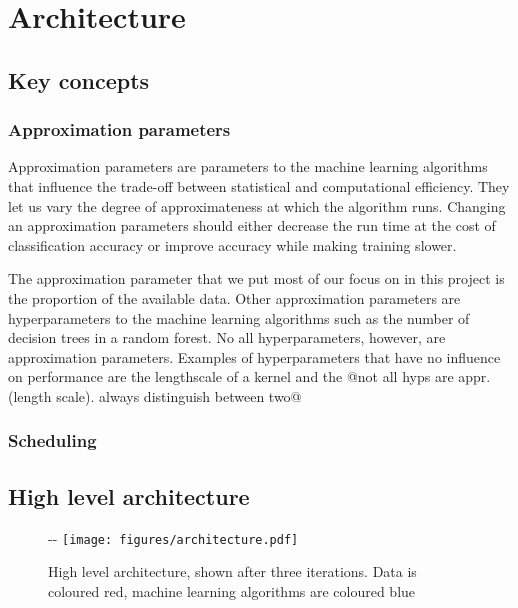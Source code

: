 \documentclass[a4paper,12pt,twoside,openright]{report}
\begin{document}
\section{Architecture} %
\subsection{Key concepts}
\subsubsection{Approximation parameters}
Approximation parameters are parameters to the machine learning algorithms that influence the trade-off between statistical and computational efficiency. They let us vary the degree of approximateness at which the algorithm runs. Changing an approximation parameters should either decrease the run time at the cost of classification accuracy or improve accuracy while making training slower. 

The approximation parameter that we put most of our focus on in this project is the proportion of the available data. Other approximation parameters are hyperparameters to the machine learning algorithms such as the number of decision trees in a random forest. No all hyperparameters, however, are approximation parameters. Examples of hyperparameters that have no influence on performance are the lengthscale of a kernel and the 
@not all hyps are appr.(length scale). always distinguish between two@

\subsubsection{Scheduling}


\subsection{High level architecture}
\begin{figure}[!ht]
  \begin{adjustwidth}{-\oddsidemargin-2in}{-\rightmargin-1.5in}
    \centering
    \texttt{[image: figures/architecture.pdf]}
    
  \end{adjustwidth}
  \caption{High level architecture, shown after three iterations. Data is coloured red, machine learning algorithms are coloured blue}
    \label{architecture}
\end{figure}
\end{document}
